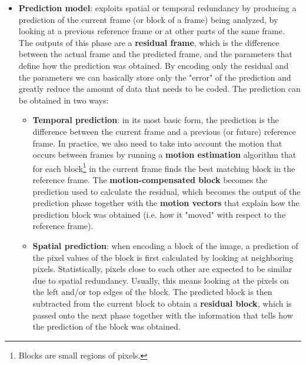 \begin{itemize}
    \item \textbf{Prediction model}: exploits spatial or temporal redundancy by producing a prediction of the current frame (or block of a frame) being analyzed, by looking at a previous reference frame or at other parts of the same frame. The outputs of this phase are a \textbf{residual frame}, which is the difference between the actual frame and the predicted frame, and the parameters that define how the prediction was obtained. By encoding only the residual and the parameters we can basically store only the "error" of the prediction and greatly reduce the amount of data that needs to be coded. The prediction can be obtained in two ways:
        \begin{itemize}
            \item \textbf{Temporal prediction}: in its most basic form, the prediction is the difference between the current frame and a previous (or future) reference frame. In practice, we also need to take into account the motion that occurs between frames by running a \textbf{motion estimation} algorithm that for each block\footnote{Blocks are small regions of pixels.} in the current frame finds the best matching block in the reference frame. The \textbf{motion-compensated block} becomes the prediction used to calculate the residual, which becomes the output of the prediction phase together with the \textbf{motion vectors} that explain how the prediction block was obtained (i.e. how it "moved" with respect to the reference frame).
            \item \textbf{Spatial prediction}: when encoding a block of the image, a prediction of the pixel values of the block is first calculated by looking at neighboring pixels. Statistically, pixels close to each other are expected to be similar due to spatial redundancy. Usually, this means looking at the pixels on the left and/or top edges of the block. The predicted block is then subtracted from the current block to obtain a \textbf{residual block}, which is passed onto the next phase together with the information that tells how the prediction of the block was obtained.
        \end{itemize}
        

\end{itemize}
